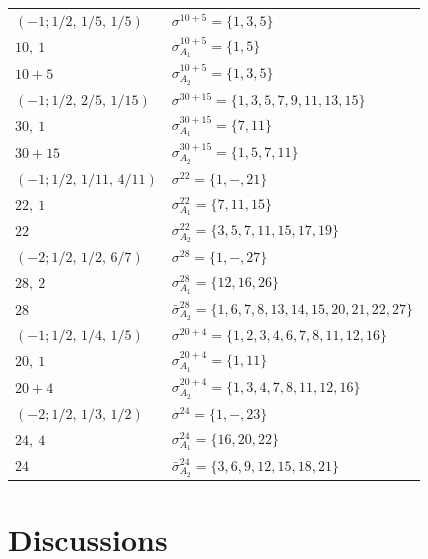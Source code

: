 \documentclass[pdftex]{sigma}
\theoremstyle{definition}
\numberwithin{equation}{section}
\begin{document}
\begin{table}[t]\centering\renewcommand{\arraystretch}{1.22}
\begin{tabular}{|ll|}\hline
$(-1;1/2,\,1/5,\,1/5) $& $\sigma^{10 + 5} = \{1,3,5\}$ \\
$10,\ 1$& $\sigma_{A_{1}}^{10 + 5} = \{1,5\}$ \\
$10 + 5$ & $\sigma_{A_{2}}^{10 + 5} = \{1,3,5\}$ \\
\hline
$(-1;1/2,\,2/5,\,1/15) $& $\sigma^{30 + 15} = \{1,3,5,7,9,11,13,15\}$ \\
$30,\ 1$& $\sigma_{A_{1}}^{30 + 15} = \{7,11\}$ \\
$30 + 15$ & $\sigma_{A_{2}}^{30 + 15} = \{1,5,7,11\}$ \\
\hline
$(-1;1/2,\,1/11,\,4/11) $& $\sigma^{22} = \{1,-,21\}$ \\
$22,\ 1$& $\sigma_{A_{1}}^{22} = \{7,11,15\}$ \\
$22$ & $\sigma_{A_{2}}^{22} = \{3,5,7,11,15,17,19\}$ \\
\hline
$(-2;1/2,\,1/2,\,6/7) $& $\sigma^{28} = \{1,-,27\}$ \\
$28,\ 2$& $\sigma_{A_{1}}^{28} = \{12,16,26\}$ \\
$28$ & $\bar\sigma_{A_{2}}^{28} = \{1,6,7,8,13,14,15,20,21,22,27\}$ \\
\hline
$(-1;1/2,\,1/4,\,1/5) $& $\sigma^{20 + 4} = \{1,2,3,4,6,7,8,11,12,16\}$ \\
$20,\ 1$& $\sigma_{A_{1}}^{20 + 4} = \{1,11\}$ \\
$20 + 4$ & $\sigma_{A_{2}}^{20 + 4} = \{1,3,4,7,8,11,12,16\}$ \\
\hline
$(-2;1/2,\,1/3,\,1/2) $& $\sigma^{24} = \{1,-,23\}$ \\
$24,\ 4$& $\sigma_{A_{1}}^{24} = \{16,20,22\}$ \\
$24$ & $\bar\sigma_{A_{2}}^{24} = \{3,6,9,12,15,18,21\}$ \\
\hline
\end{tabular}
\end{table}

\section{Discussions}\label{sec:discussions}
\end{document}
